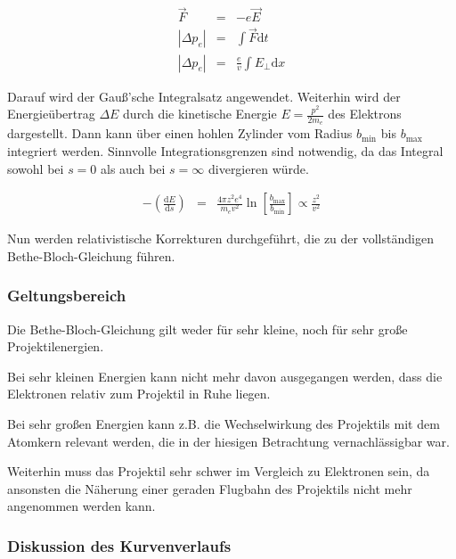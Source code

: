 \documentclass[12pt,a4paper]{scrartcl}
\numberwithin{equation}{section} %
\renewcommand{\[}{} %
\renewcommand{\]}{\noindent} %
\begin{document}
\[
\begin{eqnarray}
        \vec F &=& -e \vec E \\
        \left|\Delta p_e\right| &=& \int \vec F \mathrm dt \\
        \left|\Delta p_e\right| &=& \frac{e}{v} \int E_\perp \mathrm dx
\end{eqnarray}
\]

Darauf wird der Gauß'sche Integralsatz angewendet. Weiterhin wird der
Energieübertrag \(\Delta E\) durch die kinetische Energie
\(E=\frac{p^2}{2m_e}\) des Elektrons dargestellt. Dann kann über einen
hohlen Zylinder vom Radius \(b_\mathrm{min}\) bis \(b_\mathrm{max}\)
integriert werden. Sinnvolle Integrationsgrenzen sind notwendig, da das
Integral sowohl bei \(s=0\) als auch bei \(s=\infty\) divergieren würde.

\[
\begin{eqnarray}
        -\left(\frac{\mathrm dE}{\mathrm ds}\right)
                &=& \frac{4\pi z^2 e^4}{m_ev^2}
                        \ln\left[\frac{b_\mathrm{max}}{b_\mathrm{min}}\right]
                        \propto \frac{z^2}{v^2}
\end{eqnarray}
\]

Nun werden relativistische Korrekturen durchgeführt, die zu der
vollständigen Bethe-Bloch-Gleichung führen.

\hypertarget{geltungsbereich}{%
\subsubsection{Geltungsbereich}\label{geltungsbereich}}

Die Bethe-Bloch-Gleichung gilt weder für sehr kleine, noch für sehr
große Projektilenergien.

Bei sehr kleinen Energien kann nicht mehr davon ausgegangen werden, dass
die Elektronen relativ zum Projektil in Ruhe liegen.

Bei sehr großen Energien kann z.B. die Wechselwirkung des Projektils mit
dem Atomkern relevant werden, die in der hiesigen Betrachtung
vernachlässigbar war.

Weiterhin muss das Projektil sehr schwer im Vergleich zu Elektronen
sein, da ansonsten die Näherung einer geraden Flugbahn des Projektils
nicht mehr angenommen werden kann.

\hypertarget{diskussion-des-kurvenverlaufs}{%
\subsubsection{Diskussion des
Kurvenverlaufs}\label{diskussion-des-kurvenverlaufs}}
\end{document}
